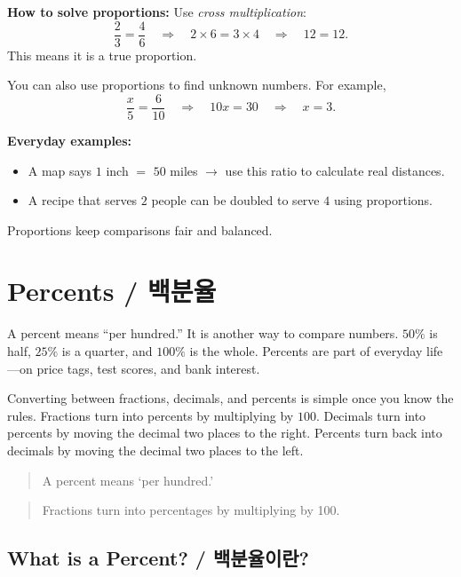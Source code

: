 \textbf{How to solve proportions:} Use \emph{cross multiplication}:
\[
\frac{2}{3}=\frac{4}{6}
\quad\Longrightarrow\quad
2\times 6 = 3\times 4
\quad\Longrightarrow\quad
12 = 12.
\]
This means it is a true proportion.

You can also use proportions to find unknown numbers. For example,
\[
\frac{x}{5}=\frac{6}{10}
\quad\Longrightarrow\quad
10x = 30 \quad\Longrightarrow\quad x = 3.
\]

\textbf{Everyday examples:}
\begin{itemize}
  \item A map says \(1\) inch \(=\) \(50\) miles \(\rightarrow\) use this ratio to calculate real distances.
  \item A recipe that serves \(2\) people can be doubled to serve \(4\) using proportions.
\end{itemize}

Proportions keep comparisons fair and balanced.



\newpage
\section{Percents / 백분율}

A percent means ``per hundred.'' It is another way to compare numbers. \(50\%\) is
half, \(25\%\) is a quarter, and \(100\%\) is the whole. Percents are part of
everyday life—on price tags, test scores, and bank interest.

Converting between fractions, decimals, and percents is simple once you know the
rules. Fractions turn into percents by multiplying by \(100\). Decimals turn into
percents by moving the decimal two places to the right. Percents turn back into
decimals by moving the decimal two places to the left.

\blockquote{A percent means ‘per hundred.’}


\blockquote{Fractions turn into percentages by multiplying by 100.}


\subsection{What is a Percent? / 백분율이란?}

